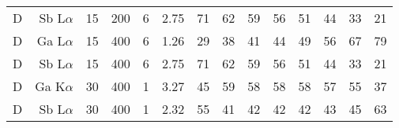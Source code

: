 \begin{table}[phtb]
\begin{center}
\begin{tabular}{rrrrrrrrrrrrrr}
            D            & Sb L$\alpha$  & 15             & 200            & 6           & 2.75              & 71             & 62           & 59            & 56             & 51             & 44             & 33            & 21             \\
            D            & Ga L$\alpha$  & 15             & 400            & 6           & 1.26              & 29             & 38           & 41            & 44             & 49             & 56             & 67            & 79             \\
            D            & Sb L$\alpha$  & 15             & 400            & 6           & 2.75              & 71             & 62           & 59            & 56             & 51             & 44             & 33            & 21             \\
            D            & Ga K$\alpha$  & 30             & 400            & 1           & 3.27              & 45             & 59           & 58            & 58             & 58             & 57             & 55            & 37             \\
            D            & Sb L$\alpha$  & 30             & 400            & 1           & 2.32              & 55             & 41           & 42            & 42             & 42             & 43             & 45            & 63             \\
            \hline
        \end{tabular}
    \end{center}
\end{table}
\restoregeometry %
